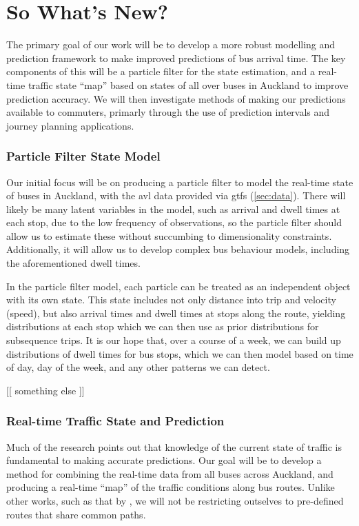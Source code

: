 \documentclass[12pt,a4paper]{article}
\begin{document}
\section{So What's New?}
\label{sec:whatsnew}

The primary goal of our work will be to develop a more robust modelling
and prediction framework to make improved predictions of bus arrival time.
The key components of this will be a particle filter for the state estimation,
and a real-time traffic state ``map'' based on states of all over buses in Auckland
to improve prediction accuracy.
We will then investigate methods of making our predictions available to commuters,
primarly through the use of prediction intervals and journey planning applications.


\subsubsection*{Particle Filter State Model}

Our initial focus will be on producing a particle filter to model the real-time state
of buses in Auckland,
with the \gls{avl} data provided via \gls{gtfs} (\cref{sec:data}).
There will likely be many latent variables in the model,
such as arrival and dwell times at each stop,
due to the low frequency of observations,
so the particle filter should allow us to estimate these without
succumbing to dimensionality constraints.
Additionally, it will allow us to develop complex bus behaviour models,
including the aforementioned dwell times.


In the particle filter model,
each particle can be treated as an independent object with its own state.
This state includes not only distance into trip and velocity (speed),
but also arrival times and dwell times at stops along the route,
yielding distributions at each stop which we can then
use as prior distributions for subsequence trips.
It is our hope that, over a course of a week,
we can build up distributions of dwell times for bus stops,
which we can then model based on time of day, day of the week,
and any other patterns we can detect.


[[ something else ]]



\subsubsection*{Real-time Traffic State and Prediction}

Much of the research points out that knowledge of the current state of traffic
is fundamental to making accurate predictions.
Our goal will be to develop a method for combining the real-time data from
all buses across Auckland,
and producing a real-time ``map'' of the traffic conditions along bus routes.
Unlike other works, such as that by \cite{yu-etal:2010},
we will not be restricting outselves to pre-defined routes that share common paths.
\end{document}
